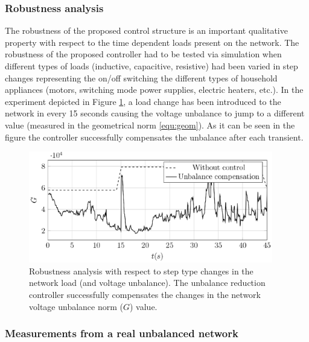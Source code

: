       \subsubsection{Robustness analysis}\label{VUB:sec:Robustness}

            The robustness of the proposed control structure is an important qualitative property with respect to the time dependent loads present on the network. The robustness of the proposed controller had to be tested via simulation when different types of loads (inductive, capacitive, resistive) had been varied in step changes representing the on/off switching the different types of household appliances (motors, switching mode power supplies, electric heaters, etc.). In the experiment depicted in Figure \ref{fig:robustness}, a load change has been introduced to the network in every 15 seconds causing the voltage unbalance to jump to a different value (measured in the geometrical norm \ref{equ:geom}). As it can be seen in the figure the controller successfully compensates the unbalance after each transient.

              \begin{figure}[ht]
            \centering
            \includegraphics[width=0.95\textwidth]{Unblance_EPS_Pics/UnbalRedComp_JCP-figure5.eps}
            \caption{Robustness analysis with respect to step type changes in the network load (and voltage unbalance). The unbalance reduction controller successfully compensates the changes in the network voltage unbalance norm ($G$) value.}
            \label{fig:robustness}
            \end{figure}

            \subsubsection{Measurements from a real unbalanced network}\label{VUB:sec:Measurement}

